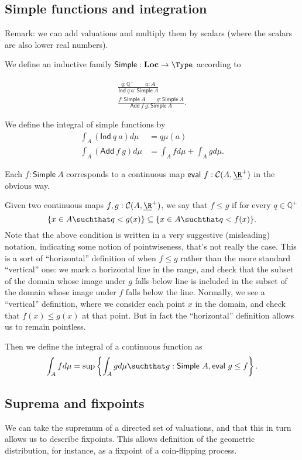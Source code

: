 \subsection{Simple functions and integration}

Remark: we can add valuations and multiply them by scalars (where the scalars are also lower real numbers).

We define an inductive family $\mathsf{Simple} : \mathbf{Loc} \to \Type$ according to

\begin{gather*}
\frac
{q : \mathbb{Q}^+ \qquad a : A}
{\mathsf{Ind}\ q\ a : \mathsf{Simple}\ A}
\\
\frac
{f : \mathsf{Simple}\ A \qquad g : \mathsf{Simple}\ A }
{\mathsf{Add}\ f\ g : \mathsf{Simple}\ A}.
\end{gather*}

We define the integral of simple functions by
\begin{align*}
   \int_A (\mathsf{Ind}\ q\ a) d\mu &= q \mu(a)
\\ \int_A (\mathsf{Add}\ f\ g) d\mu &= \int_A f d\mu + \int_A g d\mu.
\end{align*}

Each $f : \mathsf{Simple}\ A$ corresponds to a continuous map $\mathsf{eval}\ f: \mathcal{C}(A, \underline{\R}^+)$ in the obvious way.

Given two continuous maps $f, g : \mathcal{C}(A, \underline{\R}^+)$, we say that $f \le g$ if for every $q \in \mathbb{Q}^+$
\[
\{ x \in A \suchthat q < g(x) \} \subseteq \{ x \in A \suchthat q < f(x) \}.
\]
Note that the above condition is written in a very suggestive (misleading) notation, indicating some notion of pointwiseness, that's not really the case. This is a sort of ``horizontal'' definition of when $f \le g$ rather than the more standard ``vertical'' one: we mark a horizontal line in the range, and check that the subset of the domain whose image under $g$ falls below line is included in the subset of the domain whose image under $f$ falls below the line. Normally, we see a ``vertical'' definition, where we consider each point $x$ in the domain, and check that $f(x) \le g(x)$ at that point. But in fact the ``horizontal'' definition allows us to remain pointless.

Then we define the integral of a continuous function as
\[
\int_A f d\mu = \sup \left\{ \int_A g d\mu \suchthat g : \mathsf{Simple}\ A, \mathsf{eval}\ g \le f \right\}.
\]

\subsection{Suprema and fixpoints}
We can take the supremum of a directed set of valuations, and that this in turn allows us to describe fixpoints. This allows definition of the geometric distribution, for instance, as a fixpoint of a coin-flipping process.

